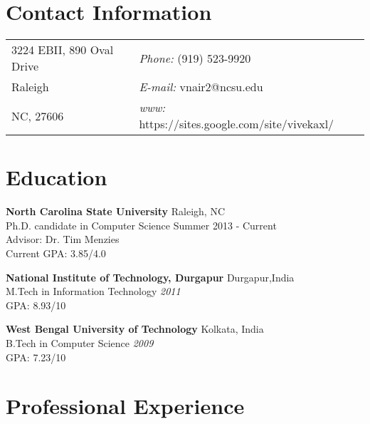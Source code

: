 \documentclass[margin,line]{res}
\begin{document}

\begin{resume}
\section{\sc Contact Information}
\vspace{.05in}
\begin{tabular}{@{}p{2in}p{4in}}
3224 EBII, 890 Oval Drive            & {\it Phone:}  (919) 523-9920 \\            
Raleigh   & {\it E-mail:}  vnair2@ncsu.edu\\         
NC, 27606 &  
  {\it www:} https://sites.google.com/site/vivekaxl/ \\
\end{tabular}



\section{\sc Education}
{\bf North Carolina State University } \hfill Raleigh, NC\\
\quad Ph.D. candidate in Computer Science  \hfill  Summer 2013 -  Current\\
Advisor: Dr. Tim Menzies\\
\quad Current GPA: 3.85/4.0 

{\bf National Institute of Technology, Durgapur } \hfill Durgapur,India \\
\quad M.Tech in Information Technology \hfill {\it 2011} \\
\quad GPA: 8.93/10


{\bf West Bengal University of Technology } \hfill Kolkata, India \\
\quad B.Tech in Computer Science \hfill {\it 2009} \\
\quad GPA: 7.23/10

\section{\sc Professional Experience}


\end{resume}
\end{document}
